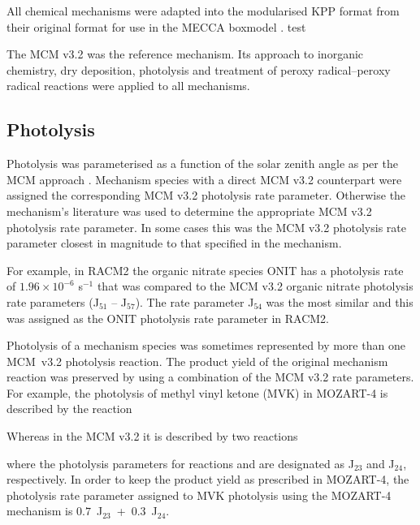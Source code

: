 All chemical mechanisms were adapted into the modularised KPP \citep{Damian:2002} format from their original format for use in the MECCA boxmodel \citep{Sander:2011}.
test

The MCM v3.2 \citep{Jenkin:1997, Jenkin:2003, Saunders:2003, Bloss:2005, MCM_Site} was the reference mechanism. 
Its approach to inorganic chemistry, dry deposition, photolysis and treatment of peroxy radical--peroxy radical reactions were applied to all mechanisms. 

\subsection{Photolysis} \label{ss:photolysis}
Photolysis was parameterised as a function of the solar zenith angle as per the MCM approach \citep{Saunders:2003}. 
Mechanism species with a direct MCM v3.2 counterpart were assigned the corresponding MCM v3.2 photolysis rate parameter. 
Otherwise the mechanism's literature was used to determine the appropriate MCM v3.2 photolysis rate parameter. 
In some cases this was the MCM v3.2 photolysis rate parameter closest in magnitude to that specified in the mechanism. 

For example, in RACM2 the organic nitrate species ONIT has a photolysis rate of $1.96 \times 10^{-6}$ s$^{-1}$ that was compared to the MCM v3.2 organic nitrate photolysis rate parameters (J$_{51}$ -- J$_{57}$). 
The rate parameter J$_{54}$ was the most similar and this was assigned as the ONIT photolysis rate parameter in RACM2.

Photolysis of a mechanism species was sometimes represented by more than one \mbox{MCM v3.2} photolysis reaction. 
The product yield of the original mechanism reaction was preserved by using a combination of the MCM v3.2 rate parameters. 
For example, the photolysis of methyl vinyl ketone (MVK) in MOZART-4 is described by the reaction
\begin{reactionlist}
\end{reactionlist} 
Whereas in the MCM v3.2 it is described by two reactions
\begin{reactionlist}
\end{reactionlist}
where the photolysis parameters for reactions  and  are designated as J$_{23}$ and J$_{24}$,
respectively. 
In order to keep the product yield as prescribed in MOZART-4, the photolysis rate parameter assigned to MVK photolysis using the MOZART-4 mechanism is \mbox{$0.7$ J$_{23}$ + $0.3$ J$_{24}$}.


